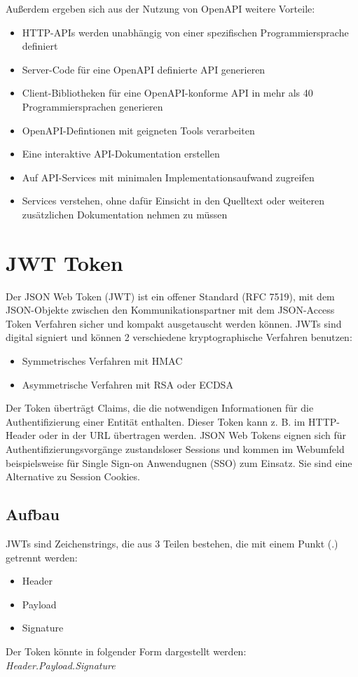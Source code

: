 Außerdem ergeben sich aus der Nutzung von OpenAPI weitere Vorteile:
\begin{itemize}
    \item HTTP-APIs werden unabhängig von einer spezifischen Programmiersprache definiert
    \item Server-Code für eine OpenAPI definierte API generieren
    \item Client-Bibliotheken für eine OpenAPI-konforme API in mehr als 40 Programmiersprachen generieren
    \item OpenAPI-Defintionen mit geigneten Tools verarbeiten
    \item Eine interaktive API-Dokumentation erstellen
    \item Auf API-Services mit minimalen Implementationsaufwand zugreifen
    \item Services verstehen, ohne dafür Einsicht in den Quelltext oder weiteren zusätzlichen Dokumentation nehmen zu müssen
\end{itemize}

\section{JWT Token}
\cite{JWTio}
\cite{JWTSecurityInsider}

Der JSON Web Token (JWT) ist ein offener Standard (RFC 7519), mit dem JSON-Objekte zwischen den Kommunikationspartner mit dem JSON-Access Token Verfahren 
sicher und kompakt ausgetauscht werden können. JWTs sind digital signiert und können 2 verschiedene kryptographische Verfahren benutzen:
\begin{itemize}
    \item Symmetrisches Verfahren mit HMAC
    \item Asymmetrische Verfahren mit RSA oder ECDSA
\end{itemize}

Der Token überträgt Claims, die die notwendigen Informationen für die Authentifizierung einer Entität enthalten. 
Dieser Token kann z. B. im HTTP-Header oder in der URL übertragen werden. JSON Web Tokens eignen sich für Authentifizierungsvorgänge zustandsloser Sessions und kommen 
im Webumfeld beispielsweise für Single Sign-on Anwendugnen (SSO) zum Einsatz. Sie sind eine Alternative zu Session Cookies. 

\subsection{Aufbau}
JWTs sind Zeichenstrings, die aus 3 Teilen bestehen, die mit einem Punkt (.) getrennt werden:
\begin{itemize}
    \item Header
    \item Payload
    \item Signature
\end{itemize}
Der Token könnte in folgender Form dargestellt werden: \textit{Header.Payload.Signature}

